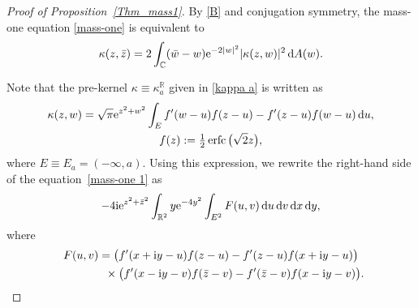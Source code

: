 \documentclass[pdftex]{sigma}
\numberwithin{equation}{section}
\newcommand{\erfc}{\operatorname{erfc}}
\newcommand{\R}{{\mathbb R}}
\newcommand{\C}{{\mathbb C}}
\newcommand{\1}{\chi}
\begin{document}
\begin{proof}[Proof of Proposition~\ref{Thm_mass1}]
	By \eqref{B} and conjugation symmetry, the mass-one equation \eqref{mass-one} is equivalent to
	\begin{gather} \label{mass-one 1}
		\kappa(z,\bar{z})=2 \int_{ \C } (\bar{w}-w) {\rm e}^{ -2|w|^2 } |\kappa(z,w)|^2 \,{\rm d}A(w).
	\end{gather}
	
	Note that the pre-kernel $\kappa \equiv \kappa_a^\R$ given in \eqref{kappa a} is written as
	\begin{gather*}
	\kappa(z,w)=\sqrt{\pi} {\rm e}^{z^2+w^2} \int_{E} f'(w-u)f(z-u)-f'(z-u) f(w-u) \,{\rm d}u, \\
	f(z):=\tfrac12 \erfc\big(\sqrt{2}z\big),
	\end{gather*}
	where $E \equiv E_a=(-\infty,a)$.
	Using this expression, we rewrite the right-hand side of the equation~\eqref{mass-one 1} as
	\begin{gather*}
	-4{\rm i} {\rm e}^{z^2+\bar{z}^2} \int_{ \R^2 } y {\rm e}^{-4y^2} \int_{ E^2 } F(u,v) \,{\rm d}u \,{\rm d}v \,{\rm d}x \,{\rm d}y,
	\end{gather*}
	where
	\begin{gather*}
		F(u,v) = \big( f'(x+{\rm i}y-u)f(z-u)-f'(z-u) f(x+{\rm i}y-u) \big)
		\\
\hphantom{F(u,v) =}{}
\times \big( f'(x-{\rm i}y-v)f(\bar{z}-v)-f'(\bar{z}-v) f(x-{\rm i}y-v) \big).
	\end{gather*}
	

\end{proof}
\end{document}
